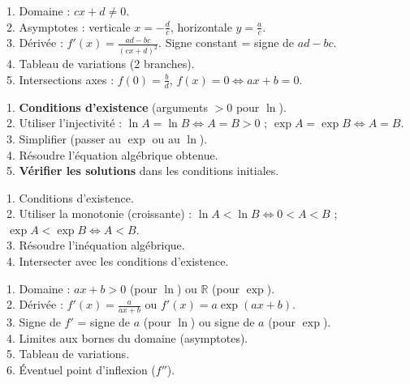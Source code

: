 \documentclass[11pt]{article}
\newcounter{popsec}
\newcounter{popsub}
\newcommand{\courssub}[1]{%
  \stepcounter{popsub}%
  \par\vspace{9pt}\noindent{\popxbold\fontsize{11.5}{13}\selectfont\color{popink}{\color{poporange}\thepopsec.\thepopsub}\hspace{6pt}#1}\par\nopagebreak\vspace{4pt}
}
\begin{document}
\begin{bilan}
\courssub{Méthodes express}

\begin{methode}[Étudier une fonction homographique $f(x)=\frac{ax+b}{cx+d}$]
1. Domaine : $cx+d\neq 0$. \\
2. Asymptotes : verticale $x=-\frac{d}{c}$, horizontale $y=\frac{a}{c}$. \\
3. Dérivée : $f'(x)=\frac{ad-bc}{(cx+d)^2}$. Signe constant = signe de $ad-bc$. \\
4. Tableau de variations (2 branches). \\
5. Intersections axes : $f(0)=\frac{b}{d}$, $f(x)=0 \Leftrightarrow ax+b=0$.
\end{methode}

\begin{methode}
1. \textbf{Conditions d'existence} (arguments $>0$ pour $\ln$). \\
2. Utiliser l'injectivité : $\ln A = \ln B \Leftrightarrow A=B>0$ ; $\exp A = \exp B \Leftrightarrow A=B$. \\
3. Simplifier (passer au $\exp$ ou au $\ln$). \\
4. Résoudre l'équation algébrique obtenue. \\
5. \textbf{Vérifier les solutions} dans les conditions initiales.
\end{methode}

\begin{methode}
1. Conditions d'existence. \\
2. Utiliser la monotonie (croissante) : $\ln A < \ln B \Leftrightarrow 0<A<B$ ; $\exp A < \exp B \Leftrightarrow A<B$. \\
3. Résoudre l'inéquation algébrique. \\
4. Intersecter avec les conditions d'existence.
\end{methode}

\begin{methode}[Étudier $f(x)=\ln(ax+b)$ ou $f(x)=\exp(ax+b)$]
1. Domaine : $ax+b>0$ (pour $\ln$) ou $\mathbb{R}$ (pour $\exp$). \\
2. Dérivée : $f'(x)=\frac{a}{ax+b}$ ou $f'(x)=a\exp(ax+b)$. \\
3. Signe de $f'$ = signe de $a$ (pour $\ln$) ou signe de $a$ (pour $\exp$). \\
4. Limites aux bornes du domaine (asymptotes). \\
5. Tableau de variations. \\
6. Éventuel point d'inflexion ($f''$).
\end{methode}

\end{bilan}
\end{document}
